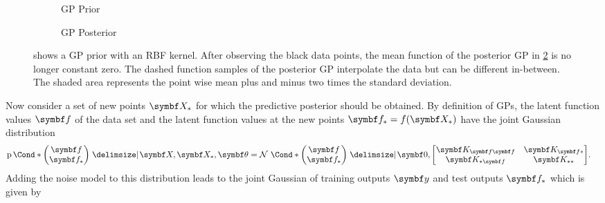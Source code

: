 \begin{figure}[t]
    \begin{subfigure}[b]{\halffigurewidth}
        \centering
        \caption{GP Prior}
        \label{fig:gp:gp_posterior:prior}
    \end{subfigure}
    \hfill
    \begin{subfigure}[b]{\halffigurewidth}
        \centering
        \caption{GP Posterior}
        \label{fig:gp:gp_posterior:posterior}
    \end{subfigure}
    \caption[GP posterior]{
         shows a GP prior with an RBF kernel.
        After observing the black data points, the mean function of the posterior GP in \cref{fig:gp:gp_posterior:posterior} is no longer constant zero.
        The dashed function samples of the posterior GP interpolate the data but can be different in-between.
        The shaded area represents the point wise mean plus and minus two times the standard deviation.
        \label{fig:gp:gp_posterior}
    }
\end{figure}
Now consider a set of new points $\mat{X}_\ast$ for which the predictive posterior should be obtained.
By definition of GPs, the latent function values $\mat{f}$ of the data set and the latent function values at the new points $\mat{f_\ast} = f(\mat{X}_\ast)$ have the joint Gaussian distribution
\begin{align}
    \Prob*{\begin{pmatrix}
            \mat{f} \\
            \mat{f}_\ast
        \end{pmatrix} \given \mat{X}, \mat{X}_\ast, \mat{\theta}} & = \Gaussian*{\begin{pmatrix}
            \mat{f} \\
            \mat{f}_\ast
        \end{pmatrix} \given \mat{0}, \begin{bmatrix}
            \mat{K}_{\mat{f}\mat{f}} & \mat{K}_{\mat{f}\ast} \\
            \mat{K}_{\ast\mat{f}}    & \mat{K}_{\ast\ast}
        \end{bmatrix}}.
\end{align}
Adding the noise model to this distribution leads to the joint Gaussian of training outputs $\mat{y}$ and test outputs $\mat{f_\ast}$ which is given by
